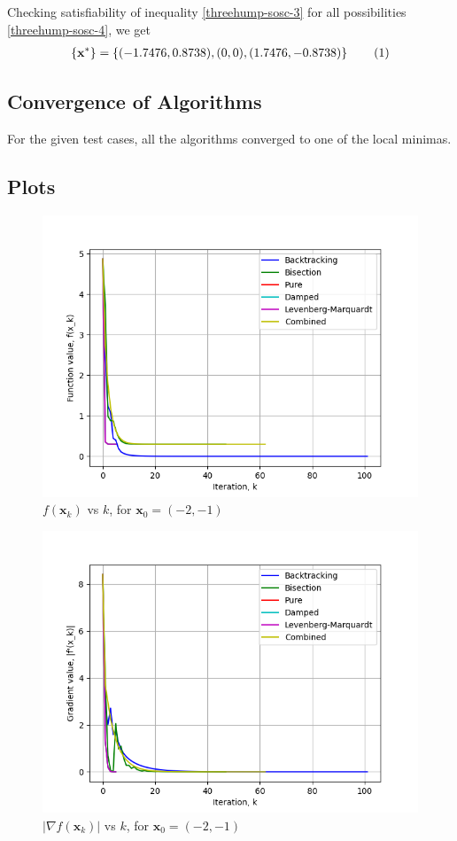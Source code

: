 \documentclass[a4paper]{article}
\newcommand\numberthis{\addtocounter{equation}{1}\tag{\theequation}}
\begin{document}
Checking satisfiability of inequality \eqref{threehump-sosc-3} for all possibilities \eqref{threehump-sosc-4}, we get
\begin{align*}
\left\{\textbf{x}^*\right\} = \left\{(-1.7476, 0.8738), (0, 0), (1.7476, -0.8738)\right\} \numberthis \label{threehump-minima}
\end{align*}

\subsection{Convergence of Algorithms}

For the given test cases, all the algorithms converged to one of the local minimas.

\subsection{Plots}

\begin{figure}[H]
      \centering
      \includegraphics[width=.65\textwidth]{images/three_hump_camel_function_vals.png}
      \caption{$f(\textbf{x}_k)$ vs $k$, for $\textbf{x}_0 = (-2, -1)$}
\end{figure}

\begin{figure}[H]
    \centering
    \includegraphics[width=.65\textwidth]{images/three_hump_camel_function_grad.png}
    \caption{$|\nabla f(\textbf{x}_k)|$ vs $k$, for $\textbf{x}_0 = (-2, -1)$}
\end{figure}
\end{document}
